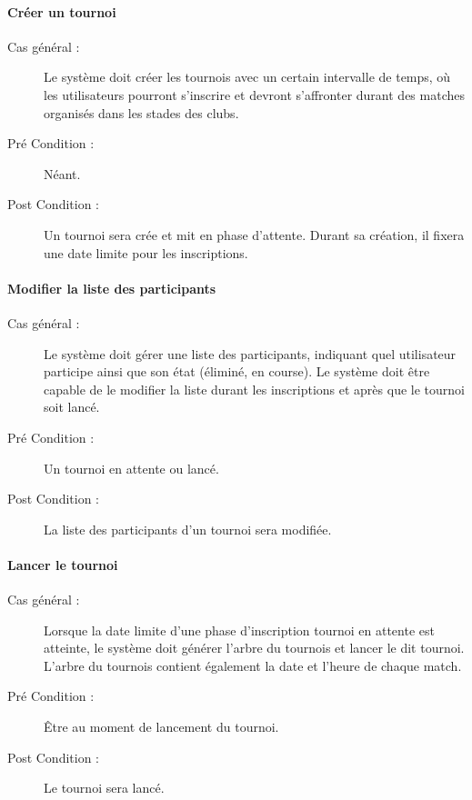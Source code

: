 \documentclass[a4paper]{article}
\begin{document}
\paragraph{Créer un tournoi}
\begin{description}
\item[Cas général :] Le système doit créer les tournois avec un certain intervalle de temps, où les \glspl{utilisateur} pourront s'inscrire et devront s'affronter durant des matches organisés dans les stades des \glspl{club}.
\item[Pré Condition  :] Néant.
\item[Post Condition :] Un tournoi sera crée et mit en phase d'attente.
Durant sa création, il fixera une date limite pour les inscriptions.
\end{description}

\paragraph{Modifier la liste des participants}
\begin{description}
\item[Cas général :] Le système doit gérer une liste des participants, indiquant quel \gls{utilisateur} participe ainsi que son état (éliminé, en course). Le système doit être capable de le modifier la liste durant les inscriptions et après que le tournoi soit lancé.
\item[Pré Condition  :] Un tournoi en attente ou lancé.
\item[Post Condition :] La liste des participants d'un tournoi sera modifiée.
\end{description}

\paragraph{Lancer le tournoi}
\begin{description}
\item[Cas général :] Lorsque la date limite d'une phase d'inscription tournoi en attente est atteinte, le système doit générer l'arbre du tournois et lancer le dit tournoi. L'arbre du tournois contient également la date et l'heure de chaque match.
\item[Pré Condition  :] Être au moment de lancement du tournoi.
\item[Post Condition :] Le tournoi sera lancé.
\end{description}
\end{document}
